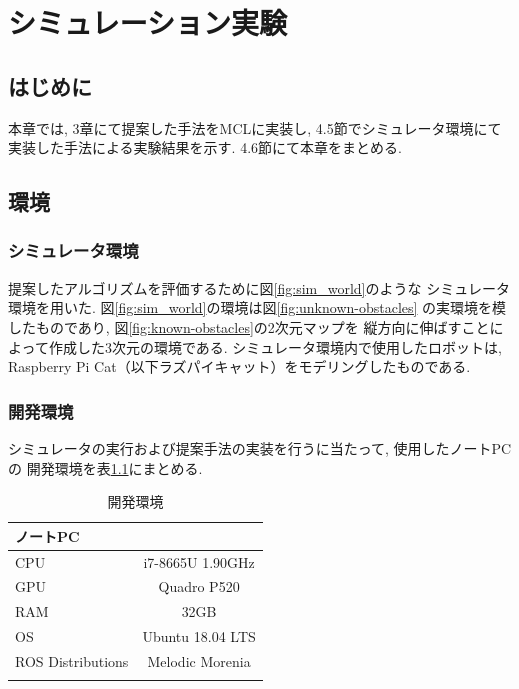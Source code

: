 \chapter{シミュレーション実験}\label{chap:simulation_experiment}

\section{はじめに}
本章では, 3章にて提案した手法をMCLに実装し, 
4.5節でシミュレータ環境にて実装した手法による実験結果を示す. 
4.6節にて本章をまとめる. 

\section{環境}

\subsection{シミュレータ環境}

提案したアルゴリズムを評価するために図\ref{fig:sim_world}のような
シミュレータ環境を用いた. 図\ref{fig:sim_world}の環境は図\ref{fig:unknown-obstacles}
の実環境を模したものであり, 図\ref{fig:known-obstacles}の2次元マップを
縦方向に伸ばすことによって作成した3次元の環境である. 
シミュレータ環境内で使用したロボットは, 
Raspberry Pi Cat（以下ラズパイキャット）をモデリングしたものである. 

\subsection{開発環境}
シミュレータの実行および提案手法の実装を行うに当たって, 使用したノートPCの
開発環境を表\ref{tabule:pc_spec_sim}にまとめる. 

\begin{table}[ht]
  \caption{開発環境}
  \label{tabule:pc_spec_sim}
  \begin{center}
    \begin{tabular}{l|c} 
      \thline
      ノートPC& \\
      \hline
      CPU & i7-8665U 1.90GHz \\
      GPU & Quadro P520 \\
      RAM & 32GB  \\
      OS & Ubuntu 18.04 LTS \\
      ROS Distributions & Melodic Morenia \\ 
      \thline
    \end{tabular}
  \end{center}
\end{table}


